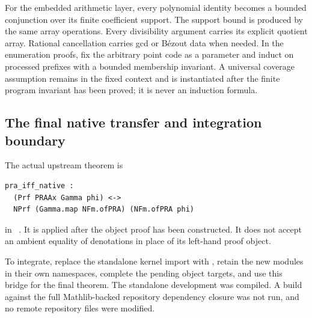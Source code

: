 For the embedded arithmetic layer, every polynomial identity becomes
a bounded conjunction over its finite coefficient support. The support
bound is produced by the same array operations. Every divisibility
argument carries its explicit quotient array. Rational cancellation
carries gcd or B\'ezout data when needed. In the enumeration proofs,
fix the arbitrary point code as a parameter and induct on processed
prefixes with a bounded membership invariant. A universal coverage
assumption remains in the fixed context and is instantiated after the
finite program invariant has been proved; it is never an induction
formula.

\subsection{The final native transfer and integration boundary}

The actual upstream theorem is
\begin{lstlisting}
pra_iff_native :
  (Prf PRAAx Gamma phi) <->
  NPrf (Gamma.map NFm.ofPRA) (NFm.ofPRA phi)
\end{lstlisting}
in ~\cite{repo-native}.
It is applied after the object proof has been constructed. It does
not accept an ambient equality of denotations in place of its left-hand
proof object.

To integrate, replace the standalone kernel import with
, retain the new modules in their own
namespaces, complete the pending object targets, and use this bridge
for the final theorem. The standalone development was compiled.
A build against the full Mathlib-backed repository dependency closure
was not run, and no remote repository files were modified.
